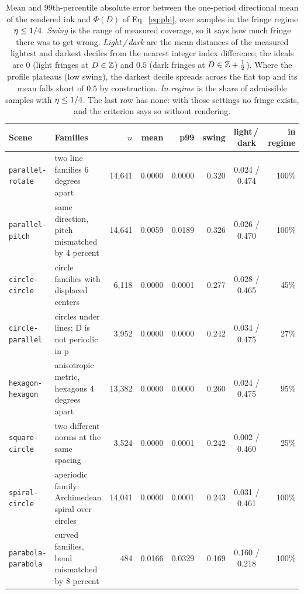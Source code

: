 \begin{table}[t]
\caption{ Mean and $99$th-percentile absolute
error between the one-period directional mean of the rendered ink and $\Phi(D)$ of
Eq.~\ref{eq:phi}, over samples in the fringe regime $\eta\le1/4$. \emph{Swing} is
the range of measured coverage, so it says how much fringe there was to get wrong.
\emph{Light\,/\,dark} are the mean distances of the measured lightest and darkest
deciles from the nearest integer index difference; the ideals are $0$ (light
fringes at $D\in\mathbb{Z}$) and $0.5$ (dark fringes at $D\in\mathbb{Z}+\tfrac12$). Where the
profile plateaus (low swing), the darkest decile spreads across the flat top and
its mean falls short of $0.5$ by construction. \emph{In regime} is the share of admissible samples with $\eta\le1/4$. The
last row has none: with those settings no fringe exists, and the criterion says so
without rendering.}
\label{tab:fringe}
\footnotesize
\centering
\begin{tabular}{@{}llrrrrcr@{}}
\toprule
Scene & Families & $n$ & mean & p99 & swing & light\,/\,dark & in regime \\
\midrule
\texttt{parallel-rotate} & two line families 6 degrees apart & 14,641 & 0.0000 & 0.0000 & 0.320 & 0.024 / 0.474 & 100\% \\
\texttt{parallel-pitch} & same direction, pitch mismatched by 4 percent & 14,641 & 0.0059 & 0.0189 & 0.326 & 0.026 / 0.470 & 100\% \\
\texttt{circle-circle} & circle families with displaced centers & 6,118 & 0.0000 & 0.0001 & 0.277 & 0.028 / 0.465 & 45\% \\
\texttt{circle-parallel} & circles under lines; D is not periodic in p & 3,952 & 0.0000 & 0.0000 & 0.242 & 0.034 / 0.475 & 27\% \\
\texttt{hexagon-hexagon} & anisotropic metric, hexagons 4 degrees apart & 13,382 & 0.0000 & 0.0000 & 0.260 & 0.024 / 0.475 & 95\% \\
\texttt{square-circle} & two different norms at the same spacing & 3,524 & 0.0000 & 0.0001 & 0.242 & 0.002 / 0.460 & 25\% \\
\texttt{spiral-circle} & aperiodic family: Archimedean spiral over circles & 14,041 & 0.0000 & 0.0001 & 0.243 & 0.031 / 0.461 & 100\% \\
\texttt{parabola-parabola} & curved families, bend mismatched by 8 percent & 484 & 0.0166 & 0.0329 & 0.169 & 0.160 / 0.218 & 100\% \\

\end{tabular}
\end{table}

